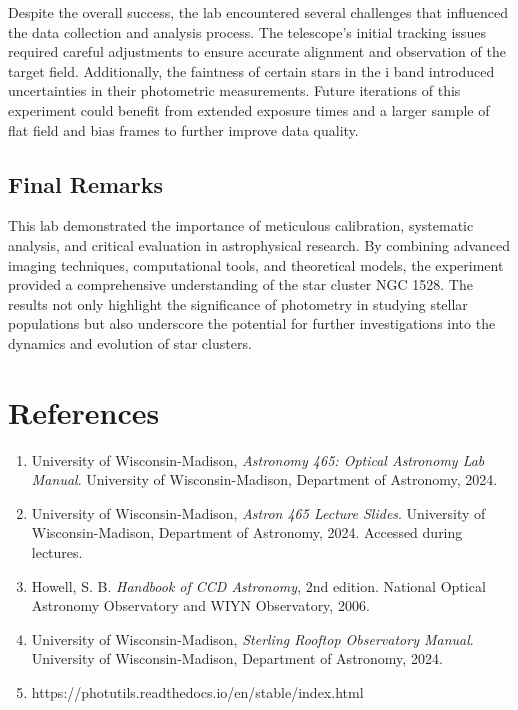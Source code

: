 \documentclass[linenumbers,twocolumn]{aastex631}
\begin{document}
Despite the overall success, the lab encountered several challenges that influenced the data collection and analysis process. The telescope's initial tracking issues required careful adjustments to ensure accurate alignment and observation of the target field. Additionally, the faintness of certain stars in the i band introduced uncertainties in their photometric measurements. Future iterations of this experiment could benefit from extended exposure times and a larger sample of flat field and bias frames to further improve data quality.

\subsection{Final Remarks}

This lab demonstrated the importance of meticulous calibration, systematic analysis, and critical evaluation in astrophysical research. By combining advanced imaging techniques, computational tools, and theoretical models, the experiment provided a comprehensive understanding of the star cluster NGC 1528. The results not only highlight the significance of photometry in studying stellar populations but also underscore the potential for further investigations into the dynamics and evolution of star clusters.

\section{References}

\begin{enumerate}
    \item University of Wisconsin-Madison, \textit{Astronomy 465: Optical Astronomy Lab Manual}. University of Wisconsin-Madison, Department of Astronomy, 2024.
    
    \item University of Wisconsin-Madison, \textit{Astron 465 Lecture Slides}. University of Wisconsin-Madison, Department of Astronomy, 2024. Accessed during lectures.

    \item Howell, S. B. \textit{Handbook of CCD Astronomy}, 2nd edition. National Optical Astronomy Observatory and WIYN Observatory, 2006.

    \item University of Wisconsin-Madison, \textit{Sterling Rooftop Observatory Manual}. University of Wisconsin-Madison, Department of Astronomy, 2024.

    \item https://photutils.readthedocs.io/en/stable/index.html

\end{enumerate}
\end{document}
